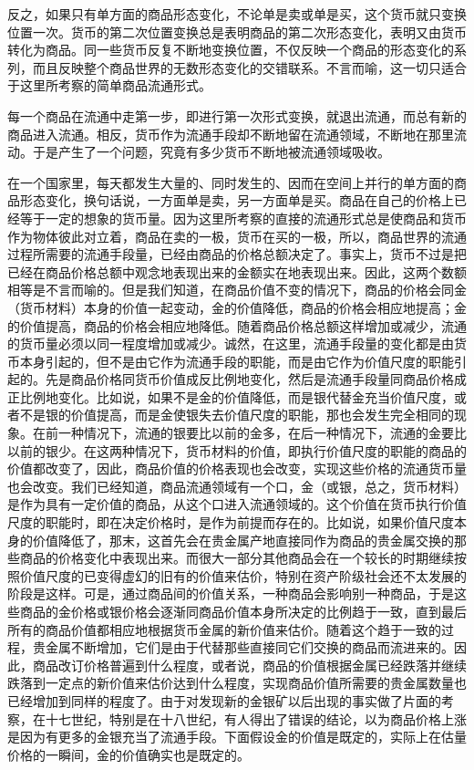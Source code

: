 \documentclass{ctexbook}
\begin{document}
        反之，如果只有单方面的商品形态变化，不论单是卖或单是买，这个货币就只变换位置一次。货币的第二次位置变换总是表明商品的第二次形态变化，表明又由货币转化为商品。同一些货币反复不断地变换位置，不仅反映一个商品的形态变化的系列，而且反映整个商品世界的无数形态变化的交错联系。不言而喻，这一切只适合于这里所考察的简单商品流通形式。
        
        每一个商品在流通中走第一步，即进行第一次形式变换，就退出流通，而总有新的商品进入流通。相反，货币作为流通手段却不断地留在流通领域，不断地在那里流动。于是产生了一个问题，究竟有多少货币不断地被流通领域吸收。
        
        在一个国家里，每天都发生大量的、同时发生的、因而在空间上并行的单方面的商品形态变化，换句话说，一方面单是卖，另一方面单是买。商品在自己的价格上已经等于一定的想象的货币量。因为这里所考察的直接的流通形式总是使商品和货币作为物体彼此对立着，商品在卖的一极，货币在买的一极，所以，商品世界的流通过程所需要的流通手段量，已经由商品的价格总额决定了。事实上，货币不过是把已经在商品价格总额中观念地表现出来的金额实在地表现出来。因此，这两个数额相等是不言而喻的。但是我们知道，在商品价值不变的情况下，商品的价格会同金（货币材料）本身的价值一起变动，金的价值降低，商品的价格会相应地提高；金的价值提高，商品的价格会相应地降低。随着商品价格总额这样增加或减少，流通的货币量必须以同一程度增加或减少。诚然，在这里，流通手段量的变化都是由货币本身引起的，但不是由它作为流通手段的职能，而是由它作为价值尺度的职能引起的。先是商品价格同货币价值成反比例地变化，然后是流通手段量同商品价格成正比例地变化。比如说，如果不是金的价值降低，而是银代替金充当价值尺度，或者不是银的价值提高，而是金使银失去价值尺度的职能，那也会发生完全相同的现象。在前一种情况下，流通的银要比以前的金多，在后一种情况下，流通的金要比以前的银少。在这两种情况下，货币材料的价值，即执行价值尺度的职能的商品的价值都改变了，因此，商品价值的价格表现也会改变，实现这些价格的流通货币量也会改变。我们已经知道，商品流通领域有一个口，金（或银，总之，货币材料）是作为具有一定价值的商品，从这个口进入流通领域的。这个价值在货币执行价值尺度的职能时，即在决定价格时，是作为前提而存在的。比如说，如果价值尺度本身的价值降低了，那末，这首先会在贵金属产地直接同作为商品的贵金属交换的那些商品的价格变化中表现出来。而很大一部分其他商品会在一个较长的时期继续按照价值尺度的已变得虚幻的旧有的价值来估价，特别在资产阶级社会还不太发展的阶段是这样。可是，通过商品间的价值关系，一种商品会影响别一种商品，于是这些商品的金价格或银价格会逐渐同商品价值本身所决定的比例趋于一致，直到最后所有的商品价值都相应地根据货币金属的新价值来估价。随着这个趋于一致的过程，贵金属不断增加，它们是由于代替那些直接同它们交换的商品而流进来的。因此，商品改订价格普遍到什么程度，或者说，商品的价值根据金属已经跌落并继续跌落到一定点的新价值来估价达到什么程度，实现商品价值所需要的贵金属数量也已经增加到同样的程度了。由于对发现新的金银矿以后出现的事实做了片面的考察，在十七世纪，特别是在十八世纪，有人得出了错误的结论，以为商品价格上涨是因为有更多的金银充当了流通手段。下面假设金的价值是既定的，实际上在估量价格的一瞬间，金的价值确实也是既定的。
        
\end{document}
